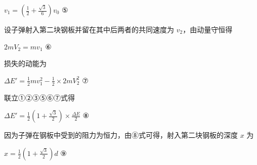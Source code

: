 \documentclass[\gkver]{gaokaozhenti}
\begin{document}
\begin{enumerate}
{$v_{1}=\left(\frac{1}{2}+\frac{\sqrt{3}}{6}\right)v_{0}$ ⑤

设子弹射入第二块钢板并留在其中后两者的共同速度为 $v_{2}$，由动量守恒得

$2mV_{2}=mv_{1}$ ⑥

损失的动能为

$\Delta E'=\frac{1}{2}mv_{1}^{2}-\frac{1}{2}\times2mV_{2}^{2}$ ⑦

联立①②③⑤⑥⑦式得

$\Delta E'=\frac{1}{2}\left(1+\frac{\sqrt{3}}{2}\right)\times\frac{\Delta E}{2}$ ⑧

因为子弹在钢板中受到的阻力为恒力，由⑧式可得，射入第二块钢板的深度 $x$ 为

$x=\frac{1}{2}\left(1+\frac{\sqrt{3}}{2}\right)d$ ⑨
}

\end{enumerate}
\end{document}
